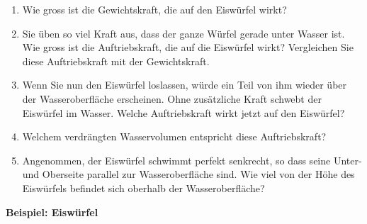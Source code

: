 \documentclass[11pt]{article}
\begin{document}
\begin{enumerate}[label=(\alph*)]
    \vspace{-0.5cm}
    \item Wie gross ist die Gewichtskraft, die auf den Eiswürfel wirkt? \vspace{2cm}
    
    \item Sie üben so viel Kraft aus, dass der ganze Würfel gerade unter Wasser ist. Wie gross ist die Auftriebskraft, die auf die Eiswürfel wirkt? Vergleichen Sie diese Auftriebskraft mit der Gewichtskraft. \vspace{2cm}
    
    \item Wenn Sie nun den Eiswürfel loslassen, würde ein Teil von ihm wieder über der Wasseroberfläche erscheinen. Ohne zusätzliche Kraft schwebt der Eiswürfel im Wasser. Welche Auftriebskraft wirkt jetzt auf den Eiswürfel? \vspace{2cm}

    \item Welchem verdrängten Wasservolumen entspricht diese Auftriebskraft? \vspace{2cm}

    \item Angenommen, der Eiswürfel schwimmt perfekt senkrecht, so dass seine Unter- und Oberseite parallel zur Wasseroberfläche sind. Wie viel von der Höhe des Eiswürfels befindet sich oberhalb der Wasseroberfläche?
\end{enumerate}


\newpage
\textbf{Beispiel: Eiswürfel}
\end{document}
